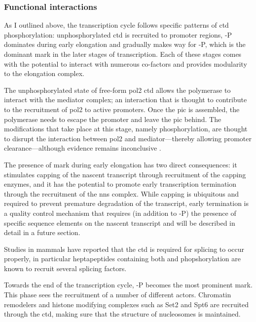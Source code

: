 \subsubsection{Functional interactions}

As I outlined above, the transcription cycle follows specific patterns of \gls{ctd} phosphorylation: unphosphorylated \gls{ctd} is recruited to promoter regions, \serf{}-P dominates during early elongation and gradually makes way for \sert{}-P, which is the dominant mark in the later stages of transcription. Each of these stages comes with the potential to interact with numerous co-factors and provides modularity to the elongation complex.

The unphosphorylated state of free-form \gls{pol2} \gls{ctd} allows the polymerase to interact with the mediator complex; an interaction that is thought to contribute to the recruitment of \gls{pol2} to active promoters. 
Once the \gls{pic} is assembled, the polymerase needs to escape the promoter and leave the \acrlong{pic} behind.
The modifications that take place at this stage, namely \serf{} phosphorylation, are thought to disrupt the interaction between \gls{pol2} and mediator---thereby allowing promoter clearance---although evidence remains inconclusive \citep{so:2007:hyperphosphorylation, davis:2002:structure}.

The presence of \serf{} mark during early elongation has two direct consequences: it stimulates capping of the nascent transcript through recruitment of the capping enzymes, and it has the potential to promote early transcription termination through the recruitment of the \gls{nns} complex.
While capping is ubiquitous and required to prevent premature degradation of the transcript, early termination is a quality control mechanism that requires (in addition to \serf{}-P) the presence of specific sequence elements on the nascent transcript and will be described in detail in a future section.

Studies in mammals have reported that the \gls{ctd} is required for splicing to occur properly, in particular heptapeptides containing both \serf{} and \sert{} phopshorylation are known to recruit several splicing factors. 

Towards the end of the transcription cycle, \sert{}-P becomes the most prominent mark. 
This phase sees the recruitment of a number of different actors.
Chromatin remodelers and histone modifying complexes such as Set2 and Spt6 are recruited through the \gls{ctd}, making sure that the structure of nucleosomes is maintained.

